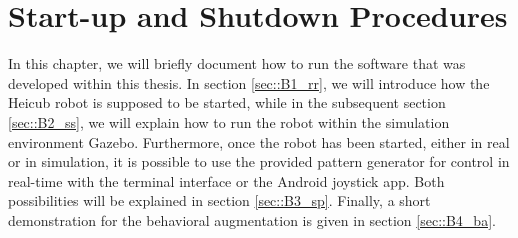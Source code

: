 \chapter{Start-up and Shutdown Procedures}
\label{sec::B_su}
In this chapter, we will briefly document how to run the software that was developed within this thesis. In section \ref{sec::B1_rr}, we will introduce how the Heicub robot is supposed to be started, while in the subsequent section \ref{sec::B2_ss}, we will explain how to run the robot within the simulation environment Gazebo. Furthermore, once the robot has been started, either in real or in simulation, it is possible to use the provided pattern generator for control in real-time with the terminal interface or the Android joystick app. Both possibilities will be explained in section \ref{sec::B3_sp}. Finally, a short demonstration for the behavioral augmentation is given in section \ref{sec::B4_ba}.
\FloatBarrier
